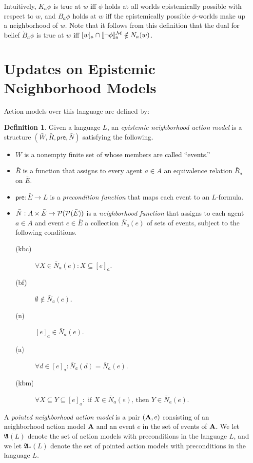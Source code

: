 \documentclass[12pt]{article}
\theoremstyle{definition}
\newtheorem{definition}[theorem]{Definition}
\newcommand{\pow}{{\cal P}}    %
\newcommand{\M}{{\cal M}}      %
\newcommand{\pre}{\mathsf{pre}}
\newcommand{\A}{{\bf A}}
\newcommand{\Actm}{\mathfrak{A}}   %
\newcommand{\semn}[1]{\llbracket{#1}\rrbracket_{\mathsf{n}}} %
\begin{document}
Intuitively, $K_a\phi$ is true at $w$ iff $\phi$ holds at all worlds
epistemically possible with respect to $w$, and $B_a\phi$ holds at $w$
iff the epistemically possible $\phi$-worlds make up a neighborhood of
$w$.  Note that it follows from this definition that the dual for
belief $\check{B}_a \phi$ is true at $w$ iff
$[w]_a\cap\semn{\neg\phi}^\M\notin N_a(w)$.

\section{Updates on Epistemic Neighborhood Models} 

Action models over this language are defined by: 

\begin{definition} 
  Given a language $L$, an \emph{epistemic neighborhood action model}
  is a structure $(\bar{W},\bar{R},\pre,\bar{N})$ satisfying the
  following.
  \begin{itemize}
  \item $\bar{W}$ is a nonempty finite set of whose members are called
    ``events.''

  \item $\bar{R}$ is a function that assigns to every agent $a \in A$
    an equivalence relation $\bar{R}_a$ on $\bar{E}$.

  \item $\pre:\bar{E}\to L$ is a \emph{precondition function} that
    maps each event to an $L$-formula.

  \item $\bar{N} : A\times \bar{E} \to \pow(\pow(\bar{E}))$ is a \emph{neighborhood
      function} that assigns to each agent $a\in A$ and event $e\in \bar{E}$
    a collection $\bar{N}_a(e)$ of sets of events, subject to the following
    conditions.
    \begin{description}
    \item[(kbc)] $\forall X \in \bar{N}_a(e) : X \subseteq [e]_a$.

    \item[(bf)] $\emptyset\notin \bar{N}_a(e)$.
      
    \item[(n)] $[e]_a\in \bar{N}_a(e)$.
      
    \item[(a)] $\forall d \in [e]_a : \bar{N}_a(d) = \bar{N}_a(e)$.

    \item[(kbm)] $\forall X \subseteq Y \subseteq [e]_a : \text{ if } X
      \in \bar{N}_a(e) \text{, then } Y \in \bar{N}_a(e)$.
    \end{description}
  \end{itemize} A \emph{pointed neighborhood action model} is a pair
  $(\A,e)$ consisting of an neighborhood action model $\A$ and an
  event $e$ in the set of events of $\A$.  We let $\Actm(L)$ denote
  the set of action models with preconditions in the language $L$, and
  we let $\Actm_*(L)$ denote the set of pointed action models with
  preconditions in the language $L$.
\end{definition}
\end{document}
